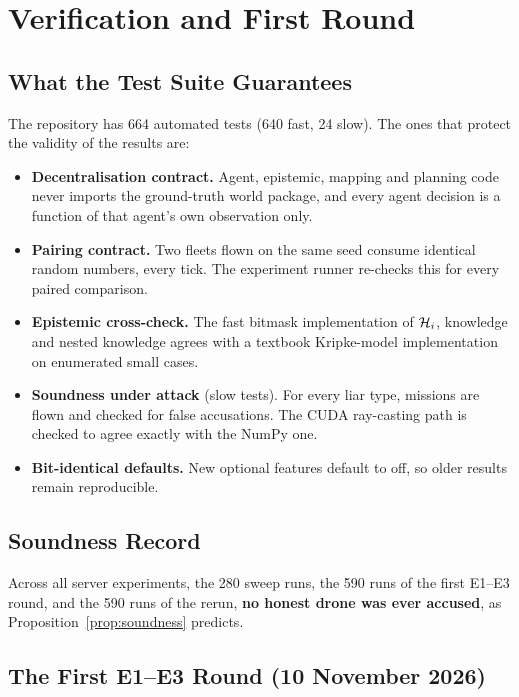 \chapter{Verification and First Round}
\label{app:verification}

\parindent0pt

\section{What the Test Suite Guarantees}

The repository has 664 automated tests (640 fast, 24 slow). The ones that protect the validity of the results are:

\begin{itemize}
    \item \textbf{Decentralisation contract.} Agent, epistemic, mapping and planning code never imports the
          ground-truth world package, and every agent decision is a function of that agent's own observation only.
    \item \textbf{Pairing contract.} Two fleets flown on the same seed consume identical random numbers, every tick. The
          experiment runner re-checks this for every paired comparison.
    \item \textbf{Epistemic cross-check.} The fast bitmask implementation of $\mathcal{H}_i$, knowledge and nested knowledge
          agrees with a textbook Kripke-model implementation on enumerated small cases.
    \item \textbf{Soundness under attack} (slow tests). For every liar type, missions are flown and checked for false
          accusations. The CUDA ray-casting path is checked to agree exactly with the NumPy one.
    \item \textbf{Bit-identical defaults.} New optional features default to off, so older results remain reproducible.
\end{itemize}

\section{Soundness Record}

Across all server experiments, the 280 sweep runs, the 590 runs of the first E1--E3 round, and the 590 runs of the
rerun, \textbf{no honest drone was ever accused}, as Proposition~\ref{prop:soundness} predicts.

\section{The First E1--E3 Round (10 November 2026)}

